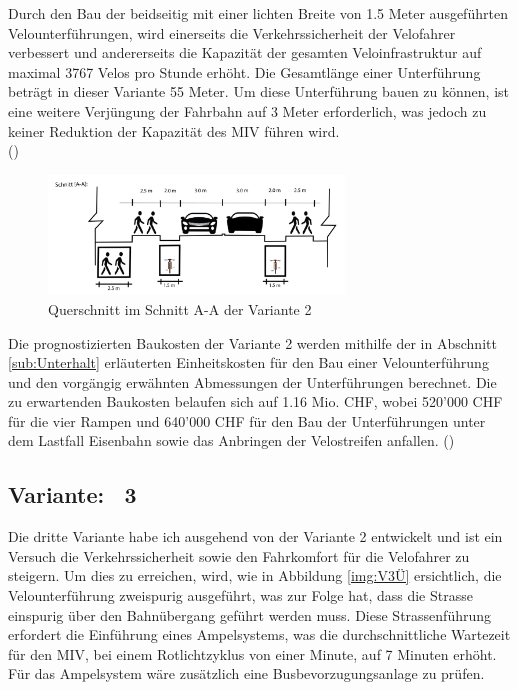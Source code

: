 Durch den Bau der beidseitig mit einer lichten Breite von 1.5 Meter ausgeführten Velounterführungen, wird einerseits die Verkehrssicherheit der Velofahrer verbessert und andererseits die Kapazität der gesamten Veloinfrastruktur auf maximal 3767 Velos pro Stunde erhöht. Die Gesamtlänge einer Unterführung beträgt in dieser Variante 55 Meter. 
Um diese Unterführung bauen zu können, ist eine weitere Verjüngung der Fahrbahn auf 3 Meter erforderlich, was jedoch zu keiner Reduktion der Kapazität des MIV führen wird.  \\ (\cite{Nacto2018})

\begin{figure}[h!]
	\centering
	\includegraphics[width=0.7\textwidth]{figures/f-04-05-02-b-V2}
	\caption[Querschnitt Variante 2]{Querschnitt im Schnitt A-A der Variante 2}
	\label{img:V2Q}
\end{figure}

Die prognostizierten Baukosten der Variante 2 werden mithilfe der in Abschnitt \ref{sub:Unterhalt} erläuterten Einheitskosten für den Bau einer Velounterführung und den vorgängig erwähnten Abmessungen der Unterführungen berechnet. Die zu erwartenden Baukosten belaufen sich auf 1.16 Mio. CHF, wobei 520'000 CHF für die vier Rampen und 640'000 CHF für den Bau der Unterführungen unter dem Lastfall Eisenbahn sowie das Anbringen der Velostreifen anfallen. (\cite{Baukosten2010}) 

\pagebreak

\subsection{Variante: \ 3}
\label{subsec:V3}

Die dritte Variante habe ich ausgehend von der Variante 2 entwickelt und ist ein Versuch die Verkehrssicherheit sowie den Fahrkomfort für die Velofahrer zu steigern. Um dies zu erreichen, wird, wie in Abbildung \ref{img:V3Ü} ersichtlich, die Velounterführung zweispurig ausgeführt, was zur Folge hat, dass die Strasse einspurig über den Bahnübergang geführt werden muss. Diese Strassenführung erfordert die Einführung eines Ampelsystems, was die durchschnittliche Wartezeit für den MIV, bei einem Rotlichtzyklus von einer Minute, auf 7 Minuten erhöht. Für das Ampelsystem wäre zusätzlich eine Busbevorzugungsanlage zu prüfen. \\

